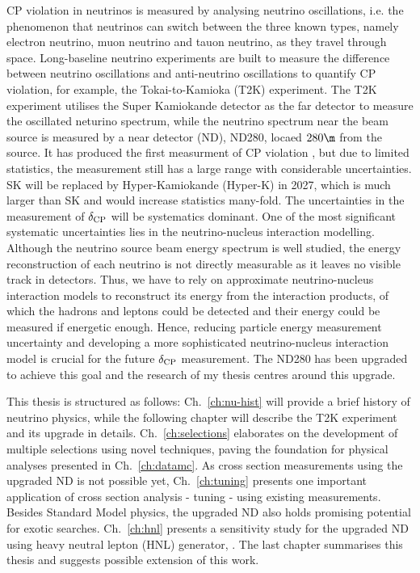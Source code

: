    CP violation in neutrinos is measured by analysing neutrino oscillations, i.e. the phenomenon that neutrinos can switch between the three known types, namely electron neutrino, muon neutrino and tauon neutrino, as they travel through space. 
   Long-baseline neutrino experiments are built to measure the difference between neutrino oscillations and anti-neutrino oscillations to quantify CP violation, for example, the Tokai-to-Kamioka (T2K) experiment. 
   The T2K experiment utilises the Super Kamiokande detector as the far detector to measure the oscillated neturino spectrum, while the neutrino spectrum near the beam source is measured by a near detector (ND), ND280, locaed $280\m$ from the source. 
   It has produced the first measurment of CP violation \cite{T2Knature}, but due to limited statistics, the measurement still has a large range with considerable uncertainties.
   SK will be replaced by Hyper-Kamiokande (Hyper-K) in 2027, which is much larger than SK and would increase statistics many-fold. 
   The uncertainties in the measurement of $\delta_\textrm{CP}$ will be systematics dominant. 
   One of the most significant systematic uncertainties lies in the neutrino-nucleus interaction modelling. 
   Although the neutrino source beam energy spectrum is well studied, the energy reconstruction of each neutrino is not directly measurable as it leaves no visible track in detectors. 
   Thus, we have to rely on approximate neutrino-nucleus interaction models to reconstruct its energy from the interaction products, of which the hadrons and leptons could be detected and their energy could be measured if energetic enough. 
   Hence, reducing particle energy measurement uncertainty and developing a more sophisticated neutrino-nucleus interaction model is crucial for the future $\delta_\textrm{CP}$ measurement. 
   The ND280 has been upgraded to achieve this goal and the research of my thesis centres around this upgrade. 

   This thesis is structured as follows: Ch.~\ref{ch:nu-hist} will provide a brief history of neutrino physics, while the following chapter will describe the T2K experiment and its upgrade in details. 
   Ch.~\ref{ch:selections} elaborates on the development of multiple selections using novel techniques, paving the foundation for physical analyses presented in Ch.~\ref{ch:datamc}. 
   As cross section measurements using the upgraded ND is not possible yet, Ch.~\ref{ch:tuning} presents one important application of cross section analysis - tuning - using existing measurements.
   Besides Standard Model physics, the upgraded ND also holds promising potential for exotic searches.
   Ch.~\ref{ch:hnl} presents a sensitivity study for the upgraded ND using heavy neutral lepton (HNL) generator, .
   The last chapter summarises this thesis and suggests possible extension of this work.


